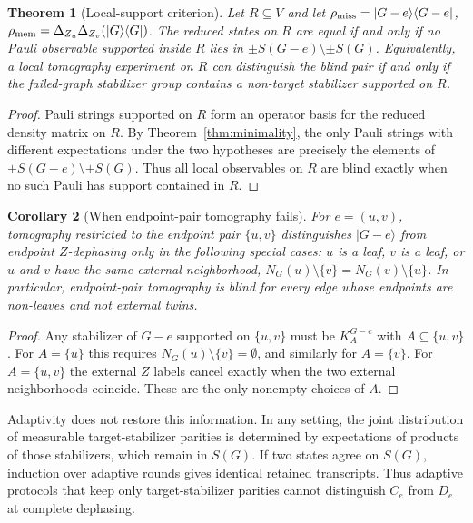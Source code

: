 \documentclass[11pt]{article}
\newtheorem{theorem}{Theorem}[section]
\newtheorem{corollary}[theorem]{Corollary}
\theoremstyle{remark}
\begin{document}
\begin{theorem}[Local-support criterion]
\label{thm:locality}
Let $R\subseteq V$ and let $\rho_{\rm miss}=|G-e\rangle\langle G-e|$, $\rho_{\rm mem}=\Delta_{Z_u}\Delta_{Z_v}(|G\rangle\langle G|)$. The reduced states on $R$ are equal if and only if no Pauli observable supported inside $R$ lies in $\pm S(G-e)\setminus\pm S(G)$. Equivalently, a local tomography experiment on $R$ can distinguish the blind pair if and only if the failed-graph stabilizer group contains a non-target stabilizer supported on $R$.
\end{theorem}

\begin{proof}
Pauli strings supported on $R$ form an operator basis for the reduced density matrix on $R$. By Theorem~\ref{thm:minimality}, the only Pauli strings with different expectations under the two hypotheses are precisely the elements of $\pm S(G-e)\setminus\pm S(G)$. Thus all local observables on $R$ are blind exactly when no such Pauli has support contained in $R$.
\end{proof}

\begin{corollary}[When endpoint-pair tomography fails]
\label{cor:pairtomo}
For $e=(u,v)$, tomography restricted to the endpoint pair $\{u,v\}$ distinguishes $|G-e\rangle$ from endpoint $Z$-dephasing only in the following special cases: $u$ is a leaf, $v$ is a leaf, or $u$ and $v$ have the same external neighborhood, $N_G(u)\setminus\{v\}=N_G(v)\setminus\{u\}$. In particular, endpoint-pair tomography is blind for every edge whose endpoints are non-leaves and not external twins.
\end{corollary}

\begin{proof}
Any stabilizer of $G-e$ supported on $\{u,v\}$ must be $K_A^{G-e}$ with $A\subseteq\{u,v\}$. For $A=\{u\}$ this requires $N_G(u)\setminus\{v\}=\emptyset$, and similarly for $A=\{v\}$. For $A=\{u,v\}$ the external $Z$ labels cancel exactly when the two external neighborhoods coincide. These are the only nonempty choices of $A$.
\end{proof}

Adaptivity does not restore this information.  In any setting, the joint distribution of measurable target-stabilizer parities is determined by expectations of products of those stabilizers, which remain in \(S(G)\).  If two states agree on \(S(G)\), induction over adaptive rounds gives identical retained transcripts.  Thus adaptive protocols that keep only target-stabilizer parities cannot distinguish \(C_e\) from \(D_e\) at complete dephasing.
\end{document}
